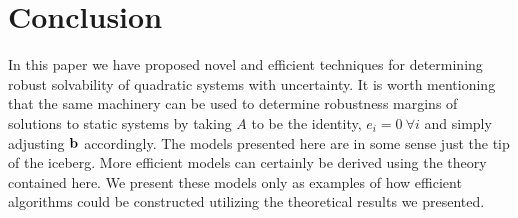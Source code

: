 \documentclass[11pt]{article}
\theoremstyle{plain}
\theoremstyle{definition}
\theoremstyle{remark}
\begin{document}
\section{Conclusion}

In this paper we have proposed novel and efficient techniques for determining robust solvability of quadratic systems with uncertainty. 
It is worth mentioning that the same machinery can be used to determine robustness margins of solutions to static systems by taking $A$ to be the identity, $e_i=0 \ \forall i$ and simply adjusting $\bold b$ accordingly. 
The models presented here are in some sense just the tip of the iceberg. 
More efficient models can certainly be derived using the theory contained here. 
We present these models only as examples of how efficient algorithms could be constructed utilizing the theoretical results we presented. \\


\end{document}
